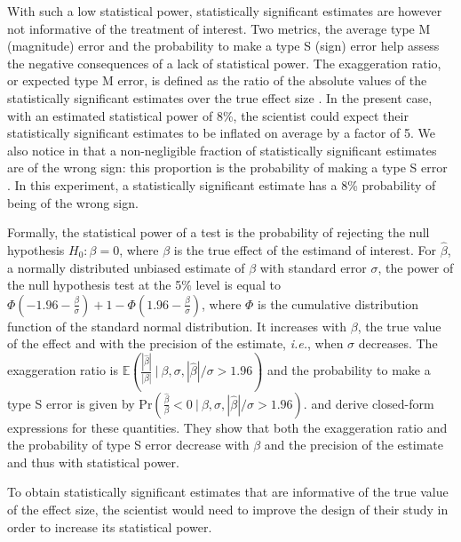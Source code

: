 \documentclass[12pt]{article}
\begin{document}
    With such a low statistical power, statistically significant estimates are however not informative of the treatment of interest. Two metrics, the average type M (magnitude) error and the probability to make a type S (sign) error help assess the negative consequences of a lack of statistical power. The exaggeration ratio, or expected type M error, is defined as the ratio of the absolute values of the statistically significant estimates over the true effect size \citep{gelman_beyond_2014}. In the present case, with an estimated statistical power of 8\%, the scientist could expect their statistically significant estimates to be inflated on average by a factor of 5. We also notice in  that a non-negligible fraction of statistically significant estimates are of the wrong sign: this proportion is the probability of making a type S error \citep{gelman_type_2000}. In this experiment, a statistically significant estimate has a 8\% probability of being of the wrong sign. 
    
    Formally, the statistical power of a test is the probability of rejecting the null hypothesis $H_{0}: \beta = 0$, where $\beta$ is the true effect of the estimand of interest. For $\hat{\beta}$, a normally distributed unbiased estimate of $\beta$ with standard error $\sigma$, the power of the null hypothesis test at the 5\% level is equal to $\Phi\left(-1.96-\frac{\beta}{\sigma}\right)+1-\Phi\left(1.96-\frac{\beta}{\sigma}\right)$, where $\Phi$ is the cumulative distribution function of the standard normal distribution. It increases with $\beta$, the true value of the effect and with the precision of the estimate, \textit{i.e.}, when $\sigma$ decreases. The exaggeration ratio is $\mathbb{E}\left(\frac{|\hat{\beta}|}{|\beta|} \ \bigg| \ \beta, \sigma, |\hat{\beta}|/\sigma>1.96\right)$ and the probability to make a type S error is given by $\text{Pr}\left(\frac{\hat{\beta}}{\beta} < 0 \ \bigg| \ \beta, \sigma, |\hat{\beta}|/\sigma>1.96 \right)$.  \cite{zwet_significance_2021} and \cite{lu_note_2019} derive closed-form expressions for these quantities. They show that both the exaggeration ratio and the probability of type S error decrease with $\beta$ and the precision of the estimate and thus with statistical power. %

    To obtain statistically significant estimates that are informative of the true value of the effect size, the scientist would need to improve the design of their study in order to increase its statistical power. %
    
\end{document}

